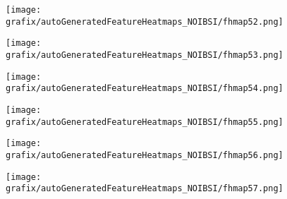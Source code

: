 \hspace{\hsp} 
\begin{subfigure}{\wid\textwidth} 
    \centering 
    \caption{\tiny \sffamily {}} 
    \vspace{\vsp} 
    \texttt{[image: grafix/autoGeneratedFeatureHeatmaps\_NOIBSI/fhmap52.png]} 
\end{subfigure} 
\hspace{\hsp} 
\begin{subfigure}{\wid\textwidth} 
    \centering 
    \caption{\tiny \sffamily {}} 
    \vspace{\vsp} 
    \texttt{[image: grafix/autoGeneratedFeatureHeatmaps\_NOIBSI/fhmap53.png]} 
\end{subfigure} 
\hspace{\hsp} 
\begin{subfigure}{\wid\textwidth} 
    \centering 
    \caption{\tiny \sffamily {}} 
    \vspace{\vsp} 
    \texttt{[image: grafix/autoGeneratedFeatureHeatmaps\_NOIBSI/fhmap54.png]} 
\end{subfigure} 
\hspace{\hsp} 
\begin{subfigure}{\wid\textwidth} 
    \centering 
    \caption{\tiny \sffamily {}} 
    \vspace{\vsp} 
    \texttt{[image: grafix/autoGeneratedFeatureHeatmaps\_NOIBSI/fhmap55.png]} 
\end{subfigure} 
\hspace{\hsp} 
\begin{subfigure}{\wid\textwidth} 
    \centering 
    \caption{\tiny \sffamily {}} 
    \vspace{\vsp} 
    \texttt{[image: grafix/autoGeneratedFeatureHeatmaps\_NOIBSI/fhmap56.png]} 
\end{subfigure} 
\hspace{\hsp} 
\begin{subfigure}{\wid\textwidth} 
    \centering 
    \caption{\tiny \sffamily {}} 
    \vspace{\vsp} 
    \texttt{[image: grafix/autoGeneratedFeatureHeatmaps\_NOIBSI/fhmap57.png]} 
\end{subfigure} 
\hspace{\hsp} 
